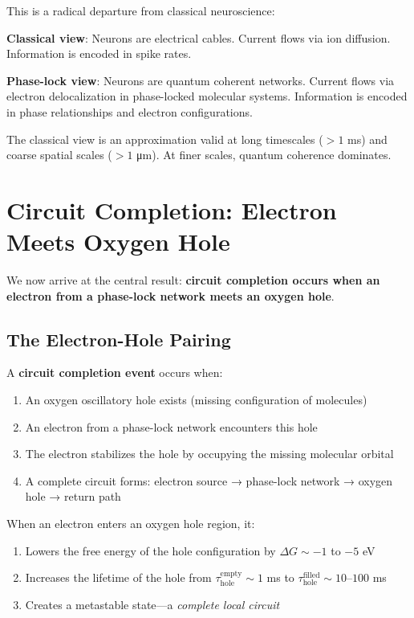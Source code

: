 \begin{remark}
This is a radical departure from classical neuroscience:

\textbf{Classical view}: Neurons are electrical cables. Current flows via ion diffusion. Information is encoded in spike rates.

\textbf{Phase-lock view}: Neurons are quantum coherent networks. Current flows via electron delocalization in phase-locked molecular systems. Information is encoded in phase relationships and electron configurations.

The classical view is an approximation valid at long timescales ($> 1$ ms) and coarse spatial scales ($> 1$ μm). At finer scales, quantum coherence dominates.
\end{remark}

\section{Circuit Completion: Electron Meets Oxygen Hole}

We now arrive at the central result: \textbf{circuit completion occurs when an electron from a phase-lock network meets an oxygen hole}.

\subsection{The Electron-Hole Pairing}

\begin{definition}
\label{def:circuit_completion}
A \textbf{circuit completion event} occurs when:
\begin{enumerate}
\item An oxygen oscillatory hole exists (missing configuration of  molecules)
\item An electron from a phase-lock network encounters this hole
\item The electron stabilizes the hole by occupying the missing molecular orbital
\item A complete circuit forms: electron source → phase-lock network → oxygen hole → return path
\end{enumerate}
\end{definition}

\begin{theorem}
\label{thm:electron_stabilization}
When an electron enters an oxygen hole region, it:
\begin{enumerate}
\item Lowers the free energy of the hole configuration by $\Delta G \sim -1$ to $-5$ eV
\item Increases the lifetime of the hole from $\tau_{\text{hole}}^{\text{empty}} \sim 1$ ms to $\tau_{\text{hole}}^{\text{filled}} \sim 10$--$100$ ms
\item Creates a metastable state—a \textit{complete local circuit}
\end{enumerate}
\end{theorem}

